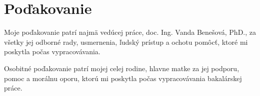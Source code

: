 \thispagestyle{empty}
\mbox{}
\vfill
\section*{Poďakovanie}

Moje poďakovanie patrí najmä vedúcej práce, doc. Ing.  Vanda Benešová, PhD., za všetky jej odborné rady, usmernenia, ľudský prístup a ochotu pomôcť, ktoré mi poskytla počas vypracovávania.

Osobitné poďakovanie patrí mojej celej rodine, hlavne matke za jej podporu, pomoc a morálnu oporu, ktorú mi poskytla počas vypracovávania bakalárskej práce.

\newpage
\thispagestyle{empty}
\mbox{}
\newpage